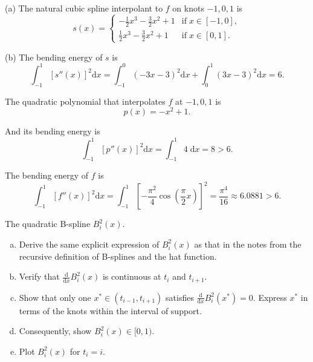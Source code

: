 \documentclass[11pt]{elegantbook}
\begin{document}
\begin{solution}
  (a) The natural cubic spline interpolant to $f$ on knots $-1,0,1$ is
  \begin{equation*}
    s(x)=\left\{
      \begin{array}{ll}
        -\frac{1}{2}x^3-\frac{3}{2}x^2+1 & \text{if}\; x\in[-1,0],\\
        \frac{1}{2}x^3-\frac{3}{2}x^2+1 & \text{if}\; x\in[0,1].
      \end{array}
    \right.
  \end{equation*}

  (b) The bending energy of $s$ is
  \begin{equation*}
    \int_{-1}^1 [s''(x)]^2 \text{d}x = \int_{-1}^0 (-3x-3)^2 \text{d}x + \int_{0}^1 (3x-3)^2 \text{d}x=6.
  \end{equation*}
  
  The quadratic polynomial that interpolates $f$ at $-1,0,1$ is
  \begin{equation*}
    p(x)=-x^2+1.
  \end{equation*}

  And its bending energy is
  \begin{equation*}
    \int_{-1}^1 [p''(x)]^2 \text{d} x = \int_{-1}^1 4 \;\text{d} x = 8 > 6.
  \end{equation*}

  The bending energy of $f$ is
  \begin{equation*}
    \int_{-1}^1 [f''(x)]^2 \text{d} x = \int_{-1}^1 \left[-\frac{\pi^2}{4}\cos\left(\frac{\pi}{2}x\right)\right]^2 = \frac{\pi^4}{16} \approx 6.0881 > 6.
  \end{equation*}
\end{solution}

\vspace{1.5em}

\begin{problem}
  The quadratic B-spline $B_i^2(x)$.
  \begin{enumerate}[(a)]
    \item Derive the same explicit expression of $B_i^2(x)$ as that in the notes from the recursive definition of B-splines and the hat function.
    \item Verify that $\frac{\text{d}}{\text{d}x}B_i^2(x)$ is continuous at $t_i$ and $t_{i+1}$.
    \item Show that only one $x^*\in(t_{i-1},t_{i+1})$ satisfies $\frac{\text{d}}{\text{d}x}B_i^2(x^*)=0$. Express $x^*$ in terms of the knots within the interval of support.
    \item Consequently, show $B_i^2(x)\in[0,1)$.
    \item Plot $B_i^2(x)$ for $t_i=i$.
  \end{enumerate}
\end{problem}
\end{document}
